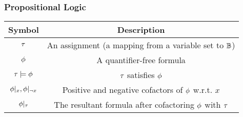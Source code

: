 \begin{frame}
      \frametitle{Propositional Logic}
      \begin{table}[t]
            \centering
            \begin{tabular}{c|c}
                  Symbol                      & Description                                                 \\
                  \hline
                  $\tau$                       & An assignment (a mapping from a variable set to $\mathbb{B}$) \\
                  $\phi$                       & A quantifier-free formula                                   \\
                  $\tau\models\phi$             & $\tau$ satisfies $\phi$                                       \\
                  $\phi|_{x},\phi|_{\lnot x}$ & Positive and negative cofactors of $\phi$ w.r.t. $x$         \\
                  $\phi|_{\tau}$            & The resultant formula after cofactoring $\phi$ with $\tau$
            \end{tabular}
      \end{table}
\end{frame}